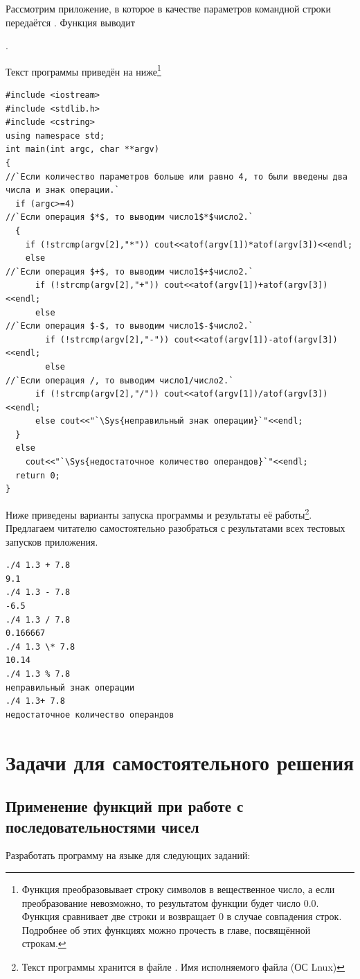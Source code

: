 Рассмотрим приложение, в которое в качестве параметров командной строки 
передаётся . Функция выводит

.

Текст программы приведён на ниже\footnote{Функция  преобразовывает строку символов в вещественное число, а если
преобразование невозможно, то результатом функции  будет число 0.0. Функция  сравнивает две строки и
возвращает 0 в случае совпадения строк. Подробнее об этих функциях можно прочесть в главе, посвящённой строкам.}
\begin{lstlisting}
#include <iostream>
#include <stdlib.h>
#include <cstring>
using namespace std;
int main(int argc, char **argv)
{
//`Если количество параметров больше или равно 4, то были введены два числа и знак операции.`
  if (argc>=4)
//`Если операция $*$, то выводим число1$*$число2.`
  {
    if (!strcmp(argv[2],"*")) cout<<atof(argv[1])*atof(argv[3])<<endl;
    else
//`Если операция $+$, то выводим число1$+$число2.`
      if (!strcmp(argv[2],"+")) cout<<atof(argv[1])+atof(argv[3])<<endl;
      else 
//`Если операция $-$, то выводим число1$-$число2.`
        if (!strcmp(argv[2],"-")) cout<<atof(argv[1])-atof(argv[3])<<endl;
        else 
//`Если операция /, то выводим число1/число2.`
	  if (!strcmp(argv[2],"/")) cout<<atof(argv[1])/atof(argv[3])<<endl;
	  else cout<<"`\Sys{неправильный знак операции}`"<<endl;	
  }
  else
    cout<<"`\Sys{недостаточное количество операндов}`"<<endl;
  return 0;
}
\end{lstlisting}

Ниже приведены варианты запуска программы и результаты её работы\footnote{Текст программы хранится в файле
. Имя исполняемого файла  (ОС Lnux)}. Предлагаем читателю самостоятельно разобраться с
результатами всех тестовых запусков приложения.
\begin{verbatim}
./4 1.3 + 7.8 
9.1 
./4 1.3 - 7.8 
-6.5 
./4 1.3 / 7.8 
0.166667 
./4 1.3 \* 7.8 
10.14 
./4 1.3 % 7.8 
неправильный знак операции 
./4 1.3+ 7.8 
недостаточное количество операндов 
\end{verbatim}

\section[Задачи для самостоятельного решения]{Задачи для самостоятельного решения}
\subsection[Применение функций при работе с последовательностями чисел]{Применение функций при работе с
последовательностями чисел}
Разработать программу на языке  для следующих заданий:

